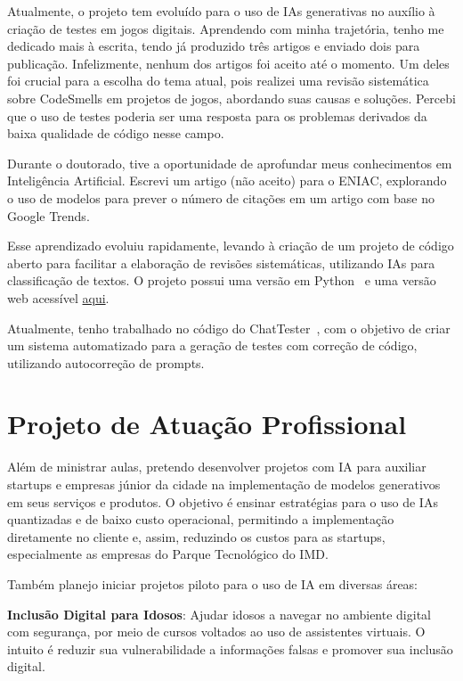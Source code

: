 \documentclass[10pt,a4paper,oneside]{book}
\begin{document}
Atualmente, o projeto tem evoluído para o uso de IAs generativas no auxílio à criação de testes em jogos digitais.
Aprendendo com minha trajetória, tenho me dedicado mais à escrita, tendo já produzido três artigos e enviado dois para
publicação. Infelizmente, nenhum dos artigos foi aceito até o momento. Um deles foi crucial para a escolha do tema atual,
pois realizei uma revisão sistemática sobre CodeSmells em projetos de jogos, abordando suas causas e soluções. Percebi
que o uso de testes poderia ser uma resposta para os problemas derivados da baixa qualidade de código nesse campo.

Durante o doutorado, tive a oportunidade de aprofundar meus conhecimentos em Inteligência Artificial. Escrevi um artigo
(não aceito) para o ENIAC, explorando o uso de modelos para prever o número de citações em um artigo com base no Google
Trends.

Esse aprendizado evoluiu rapidamente, levando à criação de um projeto de código aberto para facilitar a elaboração de
revisões sistemáticas, utilizando IAs para classificação de textos. O projeto possui uma versão em
Python~\cite{sistematicreviem} e uma versão web acessível \href{https://esdrascaleb.github.io/websm/}{aqui}.

Atualmente, tenho trabalhado no código do ChatTester~\cite{yuan2023no}, com o objetivo de criar um sistema automatizado
para a geração de testes com correção de código, utilizando autocorreção de prompts.



\chapter{Projeto de Atuação Profissional}
\label{cap_proje}

Além de ministrar aulas, pretendo desenvolver projetos com IA para auxiliar startups e empresas júnior da cidade na
implementação de modelos generativos em seus serviços e produtos. O objetivo é ensinar estratégias para o uso de IAs
quantizadas e de baixo custo operacional, permitindo a implementação diretamente no cliente e, assim, reduzindo os
custos para as startups, especialmente as empresas do Parque Tecnológico do IMD.

Também planejo iniciar projetos piloto para o uso de IA em diversas áreas:

\textbf{Inclusão Digital para Idosos}: Ajudar idosos a navegar no ambiente digital com segurança, por meio de cursos
voltados ao uso de assistentes virtuais. O intuito é reduzir sua vulnerabilidade a informações falsas e promover sua
inclusão digital.
\end{document}
